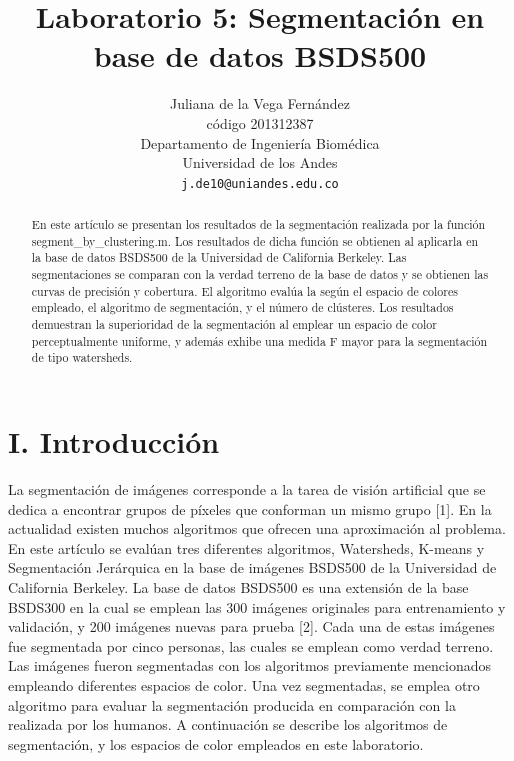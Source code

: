 \documentclass[10pt,twocolumn,letterpaper]{article}
\begin{document}
\title{Laboratorio 5: Segmentación en base de datos BSDS500}

\author{Juliana de la Vega Fernández\\
código 201312387\\
Departamento de Ingeniería Biomédica\\
Universidad de los Andes\\
{\tt\small j.de10@uniandes.edu.co}}


\maketitle

\begin{abstract}
   En este artículo se presentan los resultados de la segmentación realizada por la función segment\_by\_clustering.m. Los resultados de dicha función se obtienen al aplicarla en la base de datos BSDS500 de la Universidad de California Berkeley. Las segmentaciones se comparan con la verdad terreno de la base de datos y se obtienen las curvas de precisión y cobertura. El algoritmo evalúa la según el espacio de colores empleado, el algoritmo de segmentación, y el número de clústeres. Los resultados demuestran la superioridad de la segmentación al emplear un espacio de color perceptualmente uniforme, y además exhibe una medida F mayor para la segmentación de tipo watersheds. 
\end{abstract}

\section{\textbf{I. Introducción}}

La segmentación de imágenes corresponde a la tarea de visión artificial que se dedica a encontrar grupos de píxeles que conforman un mismo grupo [1]. En la actualidad existen muchos algoritmos que ofrecen una aproximación al problema. En este artículo se evalúan tres diferentes algoritmos, Watersheds, K-means y Segmentación Jerárquica en la base de imágenes BSDS500 de la Universidad de California Berkeley. La base de datos BSDS500 es una extensión de la base BSDS300 en la cual se emplean las 300 imágenes originales para entrenamiento y validación, y 200 imágenes nuevas para prueba [2]. Cada una de estas imágenes fue segmentada por cinco personas, las cuales se emplean como verdad terreno. Las imágenes fueron segmentadas con los algoritmos previamente mencionados empleando diferentes espacios de color.  Una vez segmentadas, se emplea otro algoritmo para evaluar la segmentación producida en comparación con la realizada por los humanos. A continuación se describe los algoritmos de segmentación, y los espacios de color empleados en este laboratorio.
\end{document}
